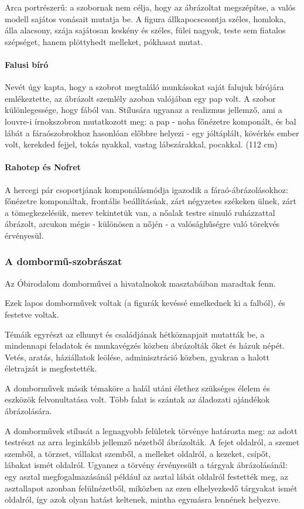 Arca portrészerű: a szobornak nem célja, hogy az ábrázoltat megszépítse, a valós modell sajátos vonásait mutatja be. A figura állkapocscsontja széles, homloka, álla alacsony, szája sajátosan keskény és széles, fülei nagyok, teste sem fiatalos szépséget, hanem plöttyhedt melleket, pókhasat mutat.

\paragraph{Falusi bíró}
Nevét úgy kapta, hogy a szobrot megtaláló munkásokat saját falujuk bírójára emlékeztette, az ábrázolt szemlély azoban valójában egy pap volt. A szobor különlegessége, hogy fából van. Stílusára ugyanaz a realizmus jellemző, ami a louvre-i írnokszobron mutatkozott meg: a pap - noha főnézetre komponált, és bal lábát a fáraószobrokhoz hasonlóan előbbre helyezi - egy jóltáplált, kövérkés ember volt, kerekded fejjel, tokás nyakkal, vastag lábszárakkal, pocakkal. (112 cm) 

\paragraph{Rahotep és Nofret}
A hercegi pár csoportjának komponálásmódja igazodik a fáraó-ábrázolásokhoz: főnézetre komponáltak, frontális beállításúak, zárt négyzetes székeken ülnek, zárt a tömegkezelésük, merev tekintetük van, a nőalak testre simuló ruházzattal ábrázolt, arcukon mégis - különösen a nőjén - a valósághűségre való törekvés érvényesül.

\subsubsection*{A dombormű-szobrászat}

Az Óbirodalom domborművei a hivatalnokok masztabáiban maradtak fenn.

Ezek lapos domborművek voltak (a figurák kevéssé emelkednek ki a falból), és festetve voltak.

Témáik egyrészt az elhunyt és családjának hétköznapjait mutatták be, a mindennapi feladatok és munkavégzés közben ábrázolták őket és házuk népét. Vetés, aratás, háziállatok leölése, adminisztráció közben, gyakran a halott életrajzát is megfestették. 

A domborművek másik témaköre a halál utáni élethez szükséges élelem és eszközök felvonultatása volt. Több falat is szántak az áladozati ajándékok ábrázolására.

A domborművek stílusát a legnagyobb felületek törvénye határozta meg: az adott testrészt az arra leginkább jellemző nézetből ábrázolták. A fejet oldalról, a szemet szemből, a törzset, vállakat szemből, a melleket oldalról, a kezeket, csípőt, lábakat ismét oldalról. Ugyanez a törvény érvényesült a tárgyak ábrázolásánál: egy asztal megfogalmazásánál például az asztal lábát oldalról festették meg, az asztallapot azonban felülnézetből, miközben az ezen elhelyezkedő tárgyakat ismét oldalról, így azok olyan hatást keltenek, mintha egymásra lennének helyezve.

